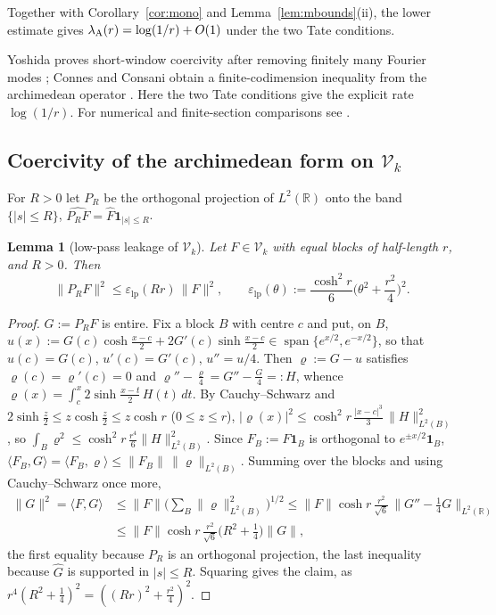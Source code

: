 \documentclass[10pt]{amsart}
\newtheorem{lemma}[theorem]{Lemma}
\theoremstyle{definition}
\theoremstyle{remark}
\newcommand{\R}{\mathbb R}
\newcommand{\Fh}{\widehat F}
\begin{document}
Together with Corollary~\ref{cor:mono} and Lemma~\ref{lem:mbounds}(ii),
the lower estimate gives $\lambda_{\rm A}(r)=\log(1/r)+O(1)$ under the two Tate conditions.

Yoshida proves short-window coercivity after removing finitely many Fourier
modes \cite[Lemma~3, p.~290]{Yoshida1992}; Connes and Consani obtain a finite-codimension
inequality from the archimedean operator \cite[Thm.~3.6]{ConnesConsani2021}.
Here the two Tate conditions give the explicit rate $\log(1/r)$.
For numerical and finite-section comparisons see \cite{Kim2026,CvS2025}.


\subsection{Coercivity of the archimedean form on $\mathcal V_k$}\label{subsec:coer-B}
For $R>0$ let $P_R$ be the orthogonal projection of $L^2(\R)$ onto the band $\{|s|\le R\}$,
$\widehat{P_RF}=\Fh\mathbf 1_{|s|\le R}$.

\begin{lemma}[low-pass leakage of $\mathcal V_k$]\label{lem:coer-lowpass}
Let $F\in\mathcal V_k$ with equal blocks of half-length $r$, and $R>0$. Then
\[
\|P_RF\|^2\le\varepsilon_{\mathrm{lp}}(Rr)\,\|F\|^2,\qquad \varepsilon_{\mathrm{lp}}(\theta):=\frac{\cosh^2r}{6}\Big(\theta^2+\frac{r^2}4\Big)^2 .
\]
\end{lemma}
\begin{proof}
$G:=P_RF$ is entire. Fix a block $B$ with centre $c$ and put, on $B$,
$u(x):=G(c)\cosh\frac{x-c}2+2G'(c)\sinh\frac{x-c}2\in\operatorname{span}\{e^{x/2},e^{-x/2}\}$, so that
$u(c)=G(c)$, $u'(c)=G'(c)$, $u''=u/4$. Then $\varrho:=G-u$ satisfies $\varrho(c)=\varrho'(c)=0$ and
$\varrho''-\frac\varrho4=G''-\frac G4=:H$, whence $\varrho(x)=\int_c^x2\sinh\frac{x-t}2\,H(t)\,dt$. By Cauchy--Schwarz and
$2\sinh\frac z2\le z\cosh\frac z2\le z\cosh r$ ($0\le z\le r$),
$|\varrho(x)|^2\le\cosh^2r\,\frac{|x-c|^3}3\,\|H\|_{L^2(B)}^2$, so $\int_B\varrho^2\le\cosh^2r\,\frac{r^4}6\|H\|_{L^2(B)}^2$.
Since $F_B:=F\mathbf 1_B$ is orthogonal to $e^{\pm x/2}\mathbf 1_B$, $\langle F_B,G\rangle=\langle F_B,\varrho\rangle\le\|F_B\|\,\|\varrho\|_{L^2(B)}$.
Summing over the blocks and using Cauchy--Schwarz once more,
\begin{align*}
\|G\|^2=\langle F,G\rangle&\le\|F\|\Big(\sum_B\|\varrho\|_{L^2(B)}^2\Big)^{1/2}\le\|F\|\cosh r\,\frac{r^2}{\sqrt6}\,\|G''-\tfrac14G\|_{L^2(\R)}\\
&\le\|F\|\cosh r\,\frac{r^2}{\sqrt6}\Big(R^2+\frac14\Big)\|G\|,
\end{align*}
the first equality because $P_R$ is an orthogonal projection, the last inequality because
$\widehat G$ is supported in $|s|\le R$. Squaring gives the claim, as $r^4(R^2+\frac14)^2=((Rr)^2+\frac{r^2}4)^2$.
\end{proof}
\end{document}
